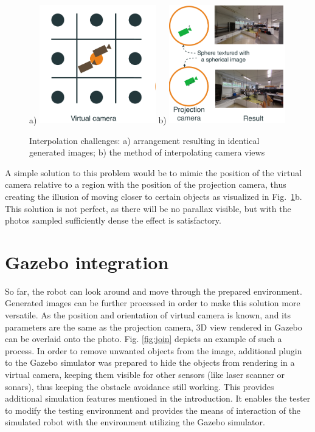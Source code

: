 \documentclass{svproc}
\begin{document}
\begin{figure}[!ht]
    \centering
    a) \includegraphics[width=0.45\textwidth]{img/interpolation/virt.pdf}
    b) \includegraphics[width=0.45\textwidth]{img/interpolation/proj.pdf}
    \caption{Interpolation challenges: a) arrangement resulting in identical generated images; b) the method of interpolating camera views}
    \label{fig:interpolation}
\end{figure}

A simple solution to this problem would be to mimic the position of the virtual camera relative 
to a region with the position of the projection camera, thus creating the illusion of moving closer 
to certain objects as visualized in Fig.~\ref{fig:interpolation}b. This solution is not perfect,
as there will be no parallax visible, but with the photos sampled sufficiently dense the effect is satisfactory.

\section{Gazebo integration}
\label{sec:gazebo}

So far, the robot can look around and move through the prepared environment. 
Generated images can be further processed in order to make this solution more versatile.
As the position and orientation of virtual camera is known, and its parameters are the same
as the projection camera, 3D view rendered in Gazebo can be overlaid onto the photo.
Fig. \ref{fig:join} depicts an example of such a process.
In order to remove unwanted objects from the image, additional plugin to the Gazebo simulator
was prepared to hide the objects from rendering in a virtual camera, keeping them 
visible for other sensors (like laser scanner or sonars), thus keeping the obstacle avoidance
still working. This provides additional simulation features mentioned in the introduction. 
It enables the tester to modify the testing environment and provides the means of interaction 
of the simulated robot with the environment utilizing the Gazebo simulator.
\end{document}
